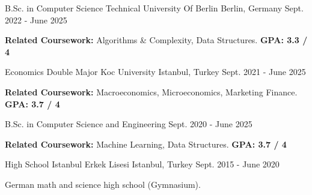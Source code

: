 
\begin{cventries}
  \cventry
    {B.Sc. in Computer Science}
    {Technical University Of Berlin}
    {Berlin, Germany}
    {Sept. 2022 - June 2025}
    {
      \begin{cvitems}
      \item {\textbf{Related Coursework: }Algorithms \& Complexity, Data Structures. \textbf{GPA: 3.3 / 4}}
      \end{cvitems}
    }

  \cventry
    {Economics Double Major}
    {Koc University}
    {Istanbul, Turkey}
    {Sept. 2021 - June 2025}
    {
      \begin{cvitems}
      \item {\textbf{Related Coursework:} Macroeconomics, Microeconomics, Marketing Finance. \textbf{GPA: 3.7 / 4}}
      \end{cvitems}
    }

  \cventry
    {B.Sc. in Computer Science and Engineering}
    {}
    {}
    {Sept. 2020 - June 2025}
    {
      \begin{cvitems}
        \item {\textbf{Related Coursework:} Machine Learning, Data Structures. \textbf{GPA: 3.7 / 4}}
      \end{cvitems}
    }

  \cventry
    {High School}
    {Istanbul Erkek Lisesi}
    {Istanbul, Turkey}
    {Sept. 2015 - June 2020}
    {
      \begin{cvitems}
      \item {German math and science high school (Gymnasium).}
      \end{cvitems}
    }

\end{cventries}
